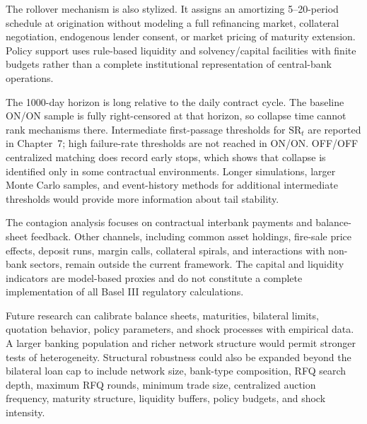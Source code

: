 The rollover mechanism is also stylized. It assigns an amortizing
5--20-period schedule at origination without modeling a full refinancing
market, collateral negotiation, endogenous lender consent, or market
pricing of maturity extension. Policy support uses
rule-based liquidity and solvency/capital facilities with finite budgets
rather than a complete institutional representation of central-bank
operations.

The 1000-day horizon is long relative to the daily contract cycle. The
baseline ON/ON sample is fully right-censored at that horizon, so
collapse time cannot rank mechanisms there. Intermediate first-passage
thresholds for \(\mathrm{SR}_t\) are reported in Chapter~7; high
failure-rate thresholds are not reached in ON/ON. OFF/OFF centralized
matching does record early stops, which shows that collapse is identified
only in some contractual environments. Longer simulations, larger Monte
Carlo samples, and event-history methods for additional intermediate
thresholds would provide more information about tail stability.

The contagion analysis focuses on contractual interbank payments and
balance-sheet feedback. Other channels, including common asset holdings,
fire-sale price effects, deposit runs, margin calls, collateral spirals,
and interactions with non-bank sectors, remain outside the current
framework. The capital and liquidity indicators are model-based proxies
and do not constitute a complete implementation of all Basel III
regulatory calculations.

Future research can calibrate balance sheets, maturities, bilateral
limits, quotation behavior, policy parameters, and shock processes with
empirical data. A larger banking population and richer network structure
would permit stronger tests of heterogeneity. Structural robustness
could also be expanded beyond the bilateral loan cap to include network
size, bank-type composition, RFQ search depth, maximum RFQ rounds,
minimum trade size, centralized auction frequency, maturity structure,
liquidity buffers, policy budgets, and shock intensity.
